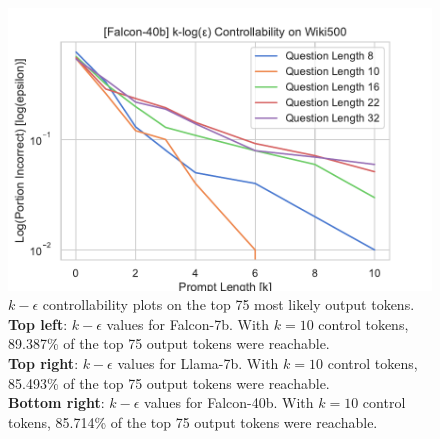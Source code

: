 \documentclass{article} %
\begin{document}
\begin{figure}[ht]
    \begin{minipage}[b]{0.48\textwidth}
        \caption{
            $k-\epsilon$ controllability plots on the top 75 most likely output tokens.  \\
            \textbf{Top left}: $k-\epsilon$ values for Falcon-7b. With $k=10$ control tokens, 89.387\% of the top 75 output tokens were reachable. \\
            \textbf{Top right}: $k-\epsilon$ values for Llama-7b. With $k=10$ control tokens, 85.493\% of the top 75 output tokens were reachable. \\
            \textbf{Bottom right}: $k-\epsilon$ values for Falcon-40b. With $k=10$ control tokens, 85.714\% of the top 75 output tokens were reachable.
            \label{fig:k_eps_75}
        }
    \end{minipage}
    \hfill
    \begin{minipage}[b]{0.48\textwidth}
        \includegraphics[width=\textwidth]{old_figs/falcon_40b/log_line_plot.pdf}
    \end{minipage}
\end{figure}
\end{document}
